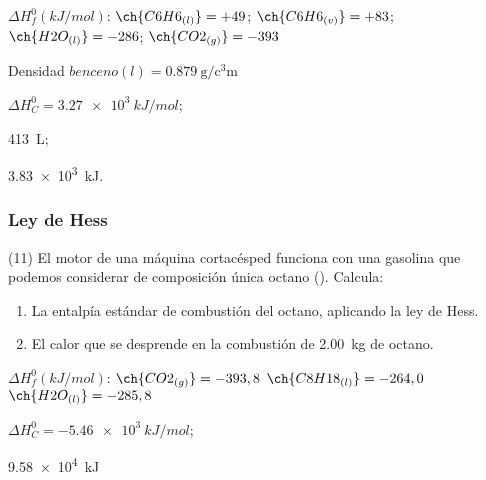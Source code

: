 \documentclass[10pt]{article}
\newenvironment{gexdatos}{
  \noindent\makebox[0pt][r]{\textit{Datos:}}
  }{\vspace{5pt}}
\begin{document}
\begin{multicols}{2}
\begin{exercise}[
    tags    = {},
    topics  = {química,química básica},
    source  = {FQ 1B MGH 2016, p85, e26},
  ]
  \begin{gexdatos}
    \( \Delta H^0_f (\si{kJ/mol}) \):
    \( \ch{C6H6_{(l)}}  = +49 \);
    \( \ch{C6H6_{(v)}}  = +83 \);
    \( \ch{H2O_{(l)}}   = -286 \);
    \( \ch{CO2_{(g)}}   = -393 \)
  \end{gexdatos}

  Densidad \( benceno(l) = \SI{0.879}{\gram\per\cubic\centi\meter} \)
\end{exercise}

\begin{solution}
  \begin{enumerate*}
    \item \( \Delta H^0_C = \SI{3.27e3}{kJ/mol} \); \item \SI{413}{\liter}; \item \SI{3.83e3}{kJ}.
  \end{enumerate*}
\end{solution}



\subsubsection{Ley de Hess}




\begin{exercise}[
    tags    = {},
    topics  = {química,química básica},
    source  = {FQ 1B MGH 2016, p85, e26},
  ]

  (11) El motor de una máquina cortacésped funciona con una gasolina que podemos considerar de composición única octano (). Calcula:

  \begin{enumerate}
    \item La entalpía estándar de combustión del octano, aplicando la ley de Hess.
    \item El calor que se desprende en la combustión de \SI{2.00}{\kilo\gram} de octano.
  \end{enumerate}

  \begin{gexdatos}
    \( \Delta H^0_f (\si{kJ/mol}) \):
    \( \ch{CO2_{(g)}}   = -393,8 \)
    \( \ch{C8H18_{(l)}} = -264,0 \)
    \( \ch{H2O_{(l)}}   = -285,8 \)
  \end{gexdatos}

\end{exercise}

\begin{solution}
  \begin{enumerate*}
    \item \( \Delta H^0_C = \SI{-5.46e3}{kJ/mol} \); \item \SI{9.58e4}{kJ}
  \end{enumerate*}
\end{solution}







\end{multicols}
\end{document}
